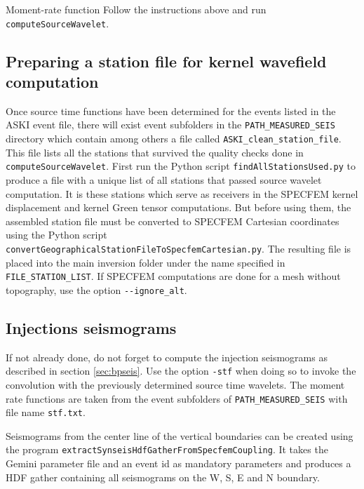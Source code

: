 %
\begin{actionbox}[label={action:moment-rate-function},float=h!]{Moment-rate function}
   Follow the instructions above and run \verb+computeSourceWavelet+.
\end{actionbox}
%
\subsection{Preparing a station file for kernel wavefield computation}
%
Once source time functions have been determined for the events listed in the ASKI event file, there will exist event subfolders in the \verb+PATH_MEASURED_SEIS+ directory which contain among others a file called \verb+ASKI_clean_station_file+. This file lists all the stations that survived the quality checks done in \verb+computeSourceWavelet+. First run the Python script \verb+findAllStationsUsed.py+ to produce a file with a unique list of all stations that passed source wavelet computation. It is these stations which serve as receivers in the SPECFEM kernel displacement and kernel Green tensor computations. But before using them, the assembled station file must be converted to SPECFEM Cartesian coordinates using the Python script \verb+convertGeographicalStationFileToSpecfemCartesian.py+. The resulting file is placed into the main inversion folder under the name specified in \\ \verb+FILE_STATION_LIST+. If SPECFEM computations are done for a mesh without topography, use the option \verb+--ignore_alt+.
%
\subsection{Injections seismograms}
%
If not already done, do not forget to compute the injection seismograms as described in section \ref{sec:bpseis}. Use the option \verb+-stf+ when doing so to invoke the convolution with the previously determined source time wavelets. The moment rate functions are taken from the event subfolders of \verb+PATH_MEASURED_SEIS+ with file name \verb+stf.txt+.

Seismograms from the center line of the vertical boundaries can be created using the program \verb+extractSynseisHdfGatherFromSpecfemCoupling+. It takes the Gemini parameter file and an event id as mandatory parameters and produces a HDF gather containing all seismograms on the W, S, E and N boundary.